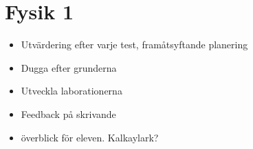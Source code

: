 \documentclass[11pt]{article}
\begin{document}
\section{Fysik 1}
    \begin{itemize}
        \item Utvärdering efter varje test, framåtsyftande planering
        \item Dugga efter grunderna
        \item Utveckla laborationerna
        \item Feedback på skrivande
        \item överblick för eleven. Kalkaylark?
    \end{itemize}
\end{document}
